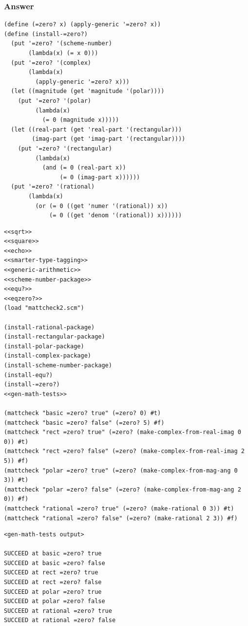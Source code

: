 \documentclass[final,fleqn,titlepage,twoside]{article}
\begin{document}
\subsubsection{Answer}
\label{sec:org6363d47}
\begin{verbatim}
(define (=zero? x) (apply-generic '=zero? x))
(define (install-=zero?)
  (put '=zero? '(scheme-number)
       (lambda(x) (= x 0)))
  (put '=zero? '(complex)
       (lambda(x)
         (apply-generic '=zero? x)))
  (let ((magnitude (get 'magnitude '(polar))))
    (put '=zero? '(polar)
         (lambda(x)
           (= 0 (magnitude x)))))
  (let ((real-part (get 'real-part '(rectangular)))
        (imag-part (get 'imag-part '(rectangular))))
    (put '=zero? '(rectangular)
         (lambda(x)
           (and (= 0 (real-part x))
                (= 0 (imag-part x))))))
  (put '=zero? '(rational)
       (lambda(x)
         (or (= 0 ((get 'numer '(rational)) x))
             (= 0 ((get 'denom '(rational)) x))))))
\end{verbatim}

\begin{verbatim}
<<sqrt>>
<<square>>
<<echo>>
<<smarter-type-tagging>>
<<generic-arithmetic>>
<<scheme-number-package>>
<<equ?>>
<<eqzero?>>
(load "mattcheck2.scm")

(install-rational-package)
(install-rectangular-package)
(install-polar-package)
(install-complex-package)
(install-scheme-number-package)
(install-equ?)
(install-=zero?)
<<gen-math-tests>>

(mattcheck "basic =zero? true" (=zero? 0) #t)
(mattcheck "basic =zero? false" (=zero? 5) #f)
(mattcheck "rect =zero? true" (=zero? (make-complex-from-real-imag 0 0)) #t)
(mattcheck "rect =zero? false" (=zero? (make-complex-from-real-imag 2 5)) #f)
(mattcheck "polar =zero? true" (=zero? (make-complex-from-mag-ang 0 3)) #t)
(mattcheck "polar =zero? false" (=zero? (make-complex-from-mag-ang 2 0)) #f)
(mattcheck "rational =zero? true" (=zero? (make-rational 0 3)) #t)
(mattcheck "rational =zero? false" (=zero? (make-rational 2 3)) #f)
\end{verbatim}

\begin{verbatim}
<gen-math-tests output>

SUCCEED at basic =zero? true
SUCCEED at basic =zero? false
SUCCEED at rect =zero? true
SUCCEED at rect =zero? false
SUCCEED at polar =zero? true
SUCCEED at polar =zero? false
SUCCEED at rational =zero? true
SUCCEED at rational =zero? false
\end{verbatim}
\end{document}
